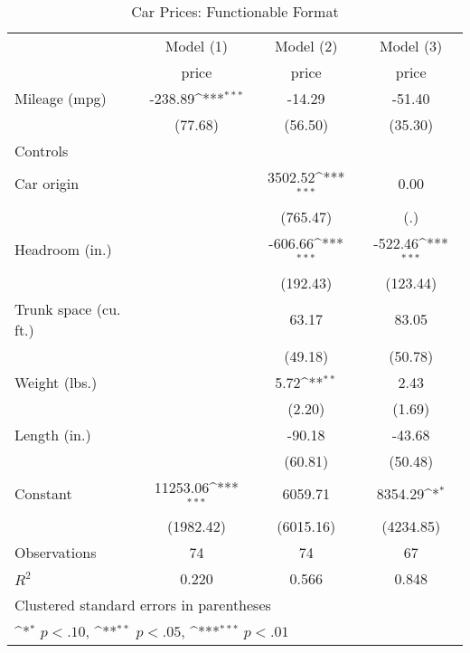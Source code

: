 \begin{table}[htbp]\centering
\def\sym#1{\ifmmode^{#1}\else\(^{#1}\)\fi}
\caption{Car Prices: Functionable Format}
\begin{tabular}{l*{3}{c}}
\hline\hline
                    &\multicolumn{1}{c}{Model (1)}&\multicolumn{1}{c}{Model (2)}&\multicolumn{1}{c}{Model (3)}\\
                    &       price         &       price         &       price         \\
\hline
Mileage (mpg)       &     -238.89\sym{***}&      -14.29         &      -51.40         \\
                    &     (77.68)         &     (56.50)         &     (35.30)         \\
Controls            &                     &                     &                     \\
Car origin          &                     &     3502.52\sym{***}&        0.00         \\
                    &                     &    (765.47)         &         (.)         \\
Headroom (in.)      &                     &     -606.66\sym{***}&     -522.46\sym{***}\\
                    &                     &    (192.43)         &    (123.44)         \\
Trunk space (cu. ft.)&                     &       63.17         &       83.05         \\
                    &                     &     (49.18)         &     (50.78)         \\
Weight (lbs.)       &                     &        5.72\sym{**} &        2.43         \\
                    &                     &      (2.20)         &      (1.69)         \\
Length (in.)        &                     &      -90.18         &      -43.68         \\
                    &                     &     (60.81)         &     (50.48)         \\
Constant            &    11253.06\sym{***}&     6059.71         &     8354.29\sym{*}  \\
                    &   (1982.42)         &   (6015.16)         &   (4234.85)         \\
\hline
Observations        &          74         &          74         &          67         \\
\(R^{2}\)           &       0.220         &       0.566         &       0.848         \\
\hline\hline
\multicolumn{4}{l}{\footnotesize Clustered standard errors in parentheses}\\
\multicolumn{4}{l}{\footnotesize \sym{*} \(p<.10\), \sym{**} \(p<.05\), \sym{***} \(p<.01\)}\\
\end{tabular}
\end{table}
